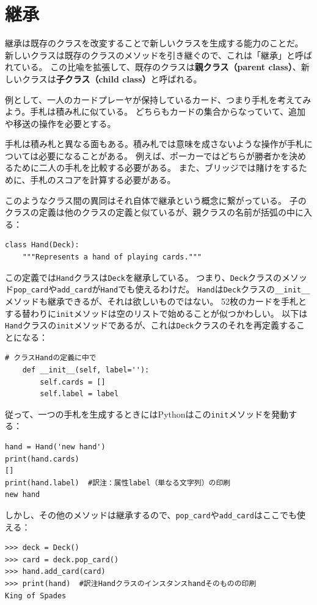 \documentclass[a4j,12pt,makeidx]{jbook}
\begin{document}
\section{継承}
継承は既存のクラスを改変することで新しいクラスを生成する能力のことだ。
新しいクラスは既存のクラスのメソッドを引き継ぐので、これは「継承」と呼ばれている。
この比喩を拡張して、既存のクラスは{\bf 親クラス（parent class）}、新しいクラスは{\bf 子クラス（child class）}と呼ばれる。 \par
例として、一人のカードプレーヤが保持しているカード、つまり手札を考えてみよう。手札は積み札に似ている。
どちらもカードの集合からなっていて、追加や移送の操作を必要とする。\par
手札は積み札と異なる面もある。積み札では意味を成さないような操作が手札については必要になることがある。
例えば、ポーカーではどちらが勝者かを決めるために二人の手札を比較する必要がある。
また、ブリッジでは賭けをするために、手札のスコアを計算する必要がある。 \par
このようなクラス間の異同はそれ自体で継承という概念に繋がっている。
子のクラスの定義は他のクラスの定義と似ているが、親クラスの名前が括弧の中に入る：
\begin{verbatim}
class Hand(Deck):
    """Represents a hand of playing cards."""
\end{verbatim}
この定義では{\tt Hand}クラスは{\tt Deck}を継承している。
つまり、{\tt Deck}クラスのメソッド{\tt pop\_card}や{\tt add\_card}が{\tt Hand}でも使えるわけだ。
{\tt Hand}は{\tt Deck}クラスの{\verb"__init__"}メソッドも継承できるが、それは欲しいものではない。
52枚のカードを手札とする替わりに{\tt init}メソッドは空のリストで始めることが似つかわしい。
以下は{\tt Hand}クラスの{\tt init}メソッドであるが、これは{\tt Deck}クラスのそれを再定義することになる：
\begin{verbatim}
# クラスHandの定義に中で
    def __init__(self, label=''):
        self.cards = []
        self.label = label
\end{verbatim}
従って、一つの手札を生成するときにはPythonはこの{\tt init}メソッドを発動する：
\begin{verbatim}
hand = Hand('new hand')
print(hand.cards)
[]
print(hand.label)  #訳注：属性label（単なる文字列）の印刷
new hand
\end{verbatim}
しかし、その他のメソッドは継承するので、{\tt pop\_card}や{\tt add\_card}はここでも使える：
\begin{verbatim}
>>> deck = Deck()
>>> card = deck.pop_card()
>>> hand.add_card(card)
>>> print(hand)  #訳注Handクラスのインスタンスhandそのものの印刷
King of Spades
\end{verbatim}
\end{document}
